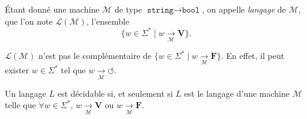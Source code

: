 \begin{defn}
	Étant donné une machine $\mathcal{M}$\/ de type $\texttt{string} \to \texttt{bool}$, on appelle \textit{langage} de $\mathcal{M}$, que l'on note $\mathcal{L}(\mathcal{M})$, l'ensemble \[
		\big\{w \in \Sigma^*  \mid w \xrightarrow[\mathcal{M}]{} \mathbf{V}\big\}
	.\]
\end{defn}

\begin{rmk}
	$\mathcal{L}(\mathcal{M})$\/ {\color{red}n'est pas} le complémentaire de $\big\{w \in \Sigma^*  \mid w \xrightarrow[\mathcal{M}]{} \mathbf{F}\big\}$. En effet, il peut exister $w \in \Sigma^*$\/ tel que $w \xrightarrow[\mathcal{M}]{} {\circlearrowleft}$.
\end{rmk}

\begin{prop}
	Un langage $L$\/ est décidable si, et seulement si $L$\/ est le langage d'une machine $\mathcal{M}$\/ telle que $\forall w \in \Sigma^*$, $w \xrightarrow[\mathcal{M}]{} \mathbf{V}$\/ ou $w \xrightarrow[\mathcal{M}]{} \mathbf{F}$.
\end{prop}




